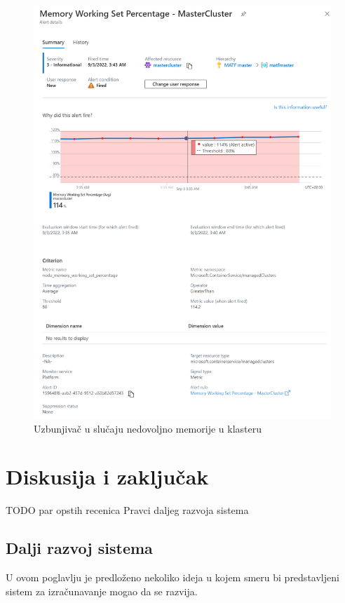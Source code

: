 \documentclass[12pt,oneside]{memoir}
\begin{document}
\begin{figure}[!ht]
  \centering
  \includegraphics[width=1\textwidth]{./images/alert_memory_pressure.png}
  \caption{Uzbunjivač u slučaju nedovoljno memorije u klasteru}
  \label{fig:alertmemory}
\end{figure}


\chapter{Diskusija i zaključak}
\label{chp:diskusijaizakljucak}

TODO par opstih recenica Pravci daljeg razvoja sistema

\section{Dalji razvoj sistema}
U ovom poglavlju je predloženo nekoliko ideja u kojem smeru bi predstavljeni sistem za izračunavanje mogao da se razvija.
\end{document}
